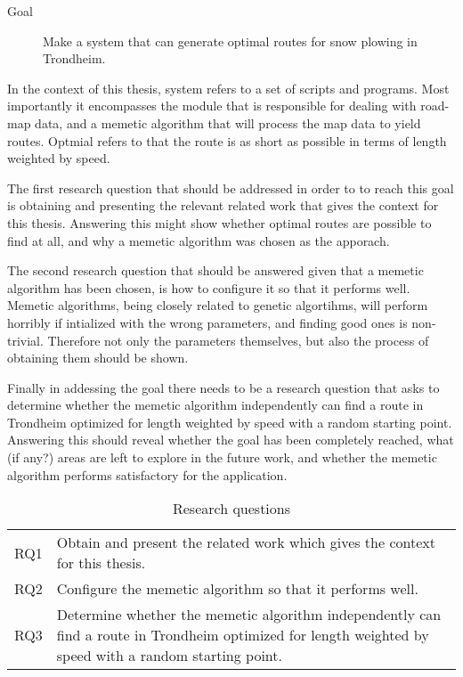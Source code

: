 \begin{description}
	\item [Goal] Make a system that can generate optimal routes for snow plowing in Trondheim.
\end{description}

In the context of this thesis, system refers to a set of scripts and programs. Most importantly it encompasses the module that is responsible for dealing with road-map data, and a memetic algorithm that will process the map data to yield routes. Optmial refers to that the route is as short as possible in terms of length weighted by speed.

The first research question that should be addressed in order to to reach this goal is obtaining and presenting the relevant related work that gives the context for this thesis. Answering this might show whether optimal routes are possible to find at all, and why a memetic algorithm was chosen as the apporach.

The second research question that should be answered given that a memetic algorithm has been chosen, is how to configure it so that it performs well. Memetic algorithms, being closely related to genetic algortihms, will perform horribly if intialized with the wrong parameters, and finding good ones is non-trivial. Therefore not only the parameters themselves, but also the process of obtaining them should be shown.

Finally in addessing the goal there needs to be a research question that asks to determine whether the memetic algorithm independently can find a route in Trondheim optimized for length weighted by speed with a random starting point. Answering this should reveal whether the goal has been completely reached, what (if any?) areas are left to explore in the future work, and whether the memetic algorithm performs satisfactory for the application.

\begin{table}[H]
\centering
\begin{tabular}{cp{}}
RQ1  &  Obtain and present the related work which gives the context for this thesis. \\
RQ2  &  Configure the memetic algorithm so that it performs well.\\
RQ3  &  Determine whether the memetic algorithm independently can find a route in Trondheim optimized for length weighted by speed with a random starting point. \\
\end{tabular}
\caption{Research questions}
\label{tab:research_questions}
\end{table}

